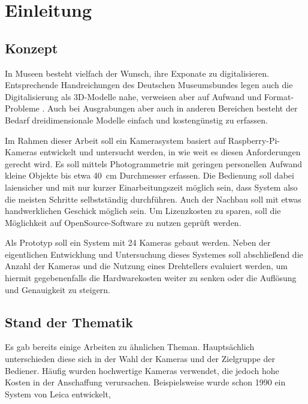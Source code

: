 \documentclass[./00PhotoBox.tex]{subfiles}
\begin{document}
\chapter{Einleitung}

\section{Konzept}

In Museen besteht vielfach der Wunsch, ihre Exponate zu digitalisieren. Entsprechende Handreichungen des Deutschen Museumsbundes legen auch die Digitalisierung als 3D-Modelle nahe, verweisen aber auf Aufwand und Format-Probleme \citep[S. 43]{handreichung_digital}.
Auch bei Ausgrabungen aber auch in anderen Bereichen besteht der Bedarf dreidimensionale Modelle einfach und kostengünstig zu erfassen.

Im Rahmen dieser Arbeit soll ein Kamerasystem basiert auf Raspberry-Pi-Kameras entwickelt und untersucht werden, in wie weit es diesen Anforderungen gerecht wird. Es soll mittels Photogrammetrie mit geringen personellen Aufwand kleine Objekte bis etwa 40~cm Durchmesser erfassen. Die Bedienung soll dabei laiensicher und mit nur kurzer Einarbeitungszeit möglich sein, dass System also die meisten Schritte selbstständig durchführen. Auch der Nachbau soll mit etwas handwerklichen Geschick möglich sein. Um Lizenzkosten zu sparen, soll die Möglichkeit auf OpenSource-Software zu nutzen geprüft werden.

Als Prototyp soll ein System mit 24 Kameras gebaut werden. Neben der eigentlichen Entwicklung und Untersuchung dieses Systemes soll abschließend die Anzahl der Kameras und die Nutzung eines Drehtellers evaluiert werden, um hiermit gegebenenfalls die Hardwarekosten weiter zu senken oder die Auflösung und Genauigkeit zu steigern.


\section{Stand der Thematik}

Es gab bereits einige Arbeiten zu ähnlichen Theman. Hauptsächlich unterschieden diese sich in der Wahl der Kameras und der Zielgruppe der Bediener. Häufig wurden hochwertige Kameras verwendet, die jedoch hohe Kosten in der Anschaffung verursachen. Beispielsweise wurde schon 1990 ein System von Leica entwickelt,



\biblio
\end{document}
